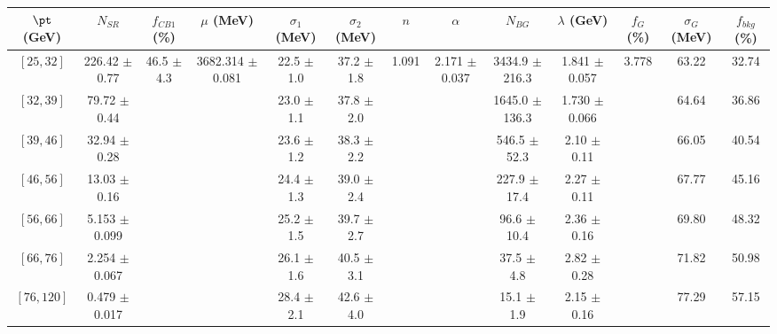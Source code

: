 \begin{tabular}{c||c|c|c|c|c|c|c|c|c|c|c||c}
$\pt$ (GeV) & $N_{SR}$ & $f_{CB1}$ (\%) & $\mu$ (MeV) & $\sigma_1$ (MeV) & $\sigma_2$ (MeV) & $n$ & $\alpha$ & $N_{BG}$ & $\lambda$ (GeV) & $f_G$ (\%) & $\sigma_G$ (MeV) & $f_{bkg}$ (\%) \\
\hline
$[25, 32]$ & 226.42 $\pm$ 0.77 & \multirow{7}{*}{46.5 $\pm$ 4.3} & \multirow{7}{*}{3682.314 $\pm$ 0.081} & 22.5 $\pm$ 1.0 & 37.2 $\pm$ 1.8 & \multirow{7}{*}{1.091} & \multirow{7}{*}{2.171 $\pm$ 0.037} & 3434.9 $\pm$ 216.3 & 1.841 $\pm$ 0.057 & \multirow{7}{*}{3.778} & 63.22 & 32.74\\
$[32, 39]$ & 79.72 $\pm$ 0.44 &  &  & 23.0 $\pm$ 1.1 & 37.8 $\pm$ 2.0 &  &  & 1645.0 $\pm$ 136.3 & 1.730 $\pm$ 0.066 &  & 64.64 & 36.86\\
$[39, 46]$ & 32.94 $\pm$ 0.28 &  &  & 23.6 $\pm$ 1.2 & 38.3 $\pm$ 2.2 &  &  & 546.5 $\pm$ 52.3 & 2.10 $\pm$ 0.11 &  & 66.05 & 40.54\\
$[46, 56]$ & 13.03 $\pm$ 0.16 &  &  & 24.4 $\pm$ 1.3 & 39.0 $\pm$ 2.4 &  &  & 227.9 $\pm$ 17.4 & 2.27 $\pm$ 0.11 &  & 67.77 & 45.16\\
$[56, 66]$ & 5.153 $\pm$ 0.099 &  &  & 25.2 $\pm$ 1.5 & 39.7 $\pm$ 2.7 &  &  & 96.6 $\pm$ 10.4 & 2.36 $\pm$ 0.16 &  & 69.80 & 48.32\\
$[66, 76]$ & 2.254 $\pm$ 0.067 &  &  & 26.1 $\pm$ 1.6 & 40.5 $\pm$ 3.1 &  &  & 37.5 $\pm$ 4.8 & 2.82 $\pm$ 0.28 &  & 71.82 & 50.98\\
$[76, 120]$ & 0.479 $\pm$ 0.017 &  &  & 28.4 $\pm$ 2.1 & 42.6 $\pm$ 4.0 &  &  & 15.1 $\pm$ 1.9 & 2.15 $\pm$ 0.16 &  & 77.29 & 57.15\\
\end{tabular}
